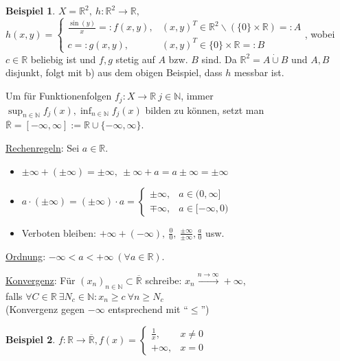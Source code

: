 \documentclass[a4paper]{scrreprt}
\newcommand{\R}{\mathbb{R}}
\newcommand{\Rq}{\overline{\R}}
\newcommand{\N}{\mathbb{N}}
\newcommand{\dcup}{\dot{\cup}}
\newcommand{\jabb}[3]{ #1: #2 \rightarrow #3 }
\newcommand{\jspacesmall}{\vspace{4pt}}
\theoremstyle{plain}
\theoremstyle{definition}
\newtheorem*{expl*}{Beispiel}
\begin{document}
{{{\begin{expl*}
    $X = \R^2, \ \jabb{h}{\R^2}{\R},$\\
    $h(x,y) = \begin{cases} \frac{\sin(y)}{x}=:f(x,y), & (x,y)^T \in \R^2\backslash (\{0\}\times \R) =: A \\ c=:g(x,y), & (x,y)^T \in \{0\} \times \R =: B \end{cases}$,
    wobei $c\in \R$ beliebig ist und $f,g$ stetig auf $A$ bzw. $B$ sind. Da $\R^2 = A\dcup B$ und $A,B$ disjunkt, folgt mit b) aus dem obigen Beispiel, dass $h$ messbar ist.
\end{expl*}
Um für Funktionenfolgen $\jabb{f_j}{X}{\R}\ j\in\N$, immer $\sup_{n\in\N} f_j(x), \inf_{n\in\N} f_j(x)$ bilden zu können, setzt man $\Rq = [-\infty, \infty] := \R \cup \{-\infty, \infty\}$.

\vspace{12pt}

\uline{Rechenregeln}: Sei $a\in \R$.
\begin{itemize}
    \item $\pm \infty + (\pm \infty) = \pm \infty, \ \pm\infty + a = a \pm \infty = \pm \infty$
    \item $a\cdot (\pm\infty) = (\pm \infty)\cdot a = \begin{cases} \pm \infty, & a\in (0, \infty] \\ \mp \infty, &a\in [-\infty, 0) \end{cases}$
    \item Verboten bleiben: $+\infty + (-\infty),\ \frac{0}{0}, \ \frac{\pm\infty}{\pm\infty}, \frac{a}{0}$ usw.
\end{itemize}

\jspacesmall

\uline{Ordnung}: $-\infty < a < +\infty \ (\forall a\in \R)$.

\jspacesmall

\uline{Konvergenz}: Für $(x_n)_{n\in\N}\subset \Rq$ schreibe: $x_n \xrightarrow{n\rightarrow \infty} +\infty$,\\
falls $\forall C\in\R \ \exists N_c \in \N: x_n \ge c \ \forall n\ge N_c$\\
(Konvergenz gegen $-\infty$ entsprechend mit ``$\le$'')

\begin{expl*}
    $\jabb{f}{\R}{\Rq}, f(x) = \begin{cases} \frac{1}{x}, & x\ne 0 \\ +\infty, &x = 0 \end{cases}$
\end{expl*}

}}}
\end{document}
